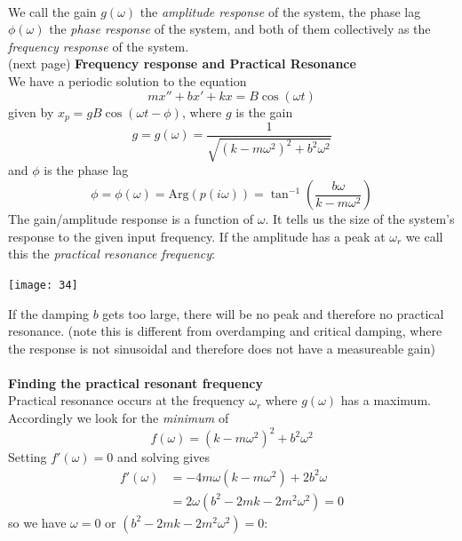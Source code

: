 \documentclass{report}
\begin{document}
\vspace{1mm}\\
We call the gain $g(\omega)$ the \textit{amplitude response} of the system, the phase lag $\phi(\omega)$
the \textit{phase response} of the system, and 
both of them collectively as the \textit{frequency response} of the system.\\
(next page)
\newpage
\noindent\textbf{Frequency response and Practical Resonance}\\
We have a periodic solution to the equation
\begin{equation*}
mx''+bx'+kx=B\cos(\omega t)
\end{equation*}
given by $x_p=gB\cos(\omega t-\phi)$, where $g$ is the gain
\begin{equation*}
g=g(\omega)=\frac{1}{\sqrt{(k-m\omega^2)^2+b^2\omega^2}}
\end{equation*}
and $\phi$ is the phase lag
\begin{equation*}
\phi=\phi(\omega)=\text{Arg}(p(i\omega))=\tan^{-1}\left(\frac{b\omega}{k-m\omega^2}\right)
\end{equation*}
The gain/amplitude response is a function of $\omega$. It tells us the size of the system's response to the
given input frequency. If the amplitude has a peak at $\omega_r$ we call this the \textit{practical
resonance frequency}:
\begin{center}
\texttt{[image: 34]}\\
\end{center}
If the damping $b$ gets too large, there will be no peak and therefore no practical resonance. 
(note this is different from overdamping and critical damping, where the response is not sinusoidal and therefore
does not have a measureable gain)\\
\vspace{1mm}\\
\textbf{Finding the practical resonant frequency}\\
Practical resonance occurs at the frequency $\omega_r$ where $g(\omega)$ has a maximum. Accordingly we look for the
\textit{minimum} of 
\begin{equation*}
f(\omega)=(k-m\omega^2)^2+b^2\omega^2
\end{equation*}
Setting $f'(\omega)=0$ and solving gives
\begin{align*}
f'(\omega)&=-4m\omega(k-m\omega^2)+2b^2\omega\\
&=2\omega(b^2-2mk-2m^2\omega^2)=0
\end{align*}
so we have $\omega=0$ or $(b^2-2mk-2m^2\omega^2)=0$:
\end{document}
